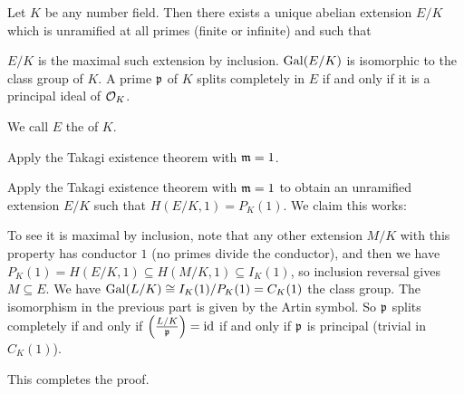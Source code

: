 \begin{dproblem}
	Let $K$ be any number field.
	Then there exists a unique abelian extension $E/K$
	which is unramified at all primes (finite or infinite)
	and such that
	\begin{itemize}
		\ii $E/K$ is the maximal such extension by inclusion.
		\ii $\operatorname{Gal}(E/K)$ is isomorphic to the class group of $K$.
		\ii A prime $\mathfrak p$ of $K$ splits completely in $E$
		if and only if it is a principal ideal of $\mathcal O_K$.
	\end{itemize}
	We call $E$ the  of $K$.
	\begin{hint}
		Apply the Takagi existence theorem with $\mathfrak m = 1$.
	\end{hint}
	\begin{sol}
		Apply the Takagi existence theorem with $\mathfrak m = 1$
		to obtain an unramified extension $E/K$ such that
		$H(E/K, 1) = P_K(1)$.
		We claim this works:
		\begin{itemize}
			\ii To see it is maximal by inclusion, note that any other extension $M/K$
			with this property has conductor $1$ (no primes divide the conductor),
			and then we have $P_K(1) = H(E/K, 1) \subseteq H(M/K, 1) \subseteq I_K(1)$,
			so inclusion reversal gives $M \subseteq E$.
			\ii We have $\operatorname{Gal}(L/K) \cong I_K(1) / P_K(1) = C_K(1)$ the class group.
			\ii The isomorphism in the previous part is given by the Artin symbol.
			So $\mathfrak p$ splits completely if and only if $\left( \frac{L/K}{\mathfrak p} \right) = \mathrm{id}$
			if and only if $\mathfrak p$ is principal (trivial in $C_K(1)$).
		\end{itemize}
		This completes the proof.
	\end{sol}
\end{dproblem}
